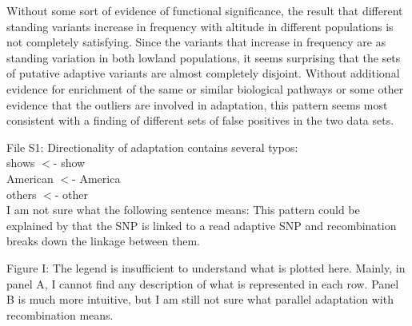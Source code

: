 \documentclass[onecolumn,oneside,letterpaper]{article}
\begin{document}
Without some sort of evidence of functional significance, the result that different standing variants increase in frequency with altitude in different populations is not completely satisfying.  Since the variants that increase in frequency are as standing variation in both lowland populations, it seems surprising that the sets of putative adaptive variants are almost completely disjoint.  Without additional evidence for enrichment of the same or similar biological pathways or some other evidence that the outliers are involved in adaptation, this pattern seems most consistent with a finding of different sets of false positives in the two data sets.  

File S1: Directionality of adaptation contains several typos: \\
shows $<$- show \\
American $<$- America \\
others $<$- other \\
I am not sure what the following sentence means: This pattern could be explained by that the SNP is linked to a read adaptive SNP and recombination breaks down the linkage between them.  

Figure I: The legend is insufficient to understand what is plotted here. Mainly, in panel A, I cannot find any description of what is represented in each row. Panel B is much more intuitive, but I am still not sure what parallel adaptation with recombination means.  




\end{document}
